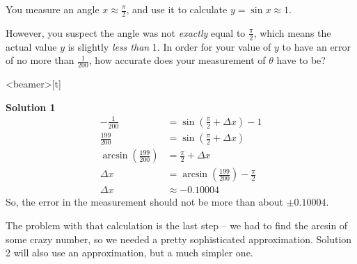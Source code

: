 \begin{frame}[t]

\AnswerSpace{}
You measure an angle $x \approx \frac{\pi}{2}$, and use it to calculate $y = \sin x \approx 1$.

However, you suspect the angle was not \textit{exactly} equal to $\frac{\pi}{2}$, which means the actual value $y$ is slightly \textit{less than} 1. In order for your value of $y$ to have an error of no more than $\frac1{200}$, how accurate does your measurement of $\theta$ have to be?
\color{answercolor}
\end{frame}
\begin{frame}<beamer>[t]
\color{answercolor}

\textbf{Solution 1} 
\begin{align*}
-\frac{1}{200}&=\sin \left(\frac{\pi}{2}+\Delta x\right) - 1\\
\frac{199}{200}&=\sin\left(\frac{\pi}{2}+\Delta x\right)\\
\arcsin\left(\frac{199}{200}\right)&=\frac{\pi}{2}+\Delta x\\
\Delta x &=\arcsin\left(\frac{199}{200}\right)-\frac{\pi}{2}\\
\Delta x & \approx -0.10004
\end{align*}
So, the error in the measurement should not be more than about $\pm 0.10004$.

The problem with that calculation is the last step -- we had to find the arcsin of some crazy number, so we needed a pretty sophisticated approximation. Solution 2 will also use an approximation, but a much simpler one.

\end{frame}
